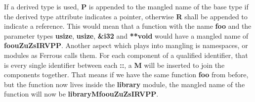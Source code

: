 \noindent
If a derived type is used, \textbf{P} is appended to the mangled name of the base type
if the derived type attribute indicates a pointer, otherwise \textbf{R} shall be appended to
indicate a reference.
\newline\newline
This would mean that a function with the name \textbf{foo}
and the parameter types \textbf{usize}, \textbf{usize}, \textbf{\&i32} and \textbf{**void}
would have a mangled name of \textbf{foouZuZsIRVPP}.
\newline\newline
Another aspect which plays into mangling is namespaces, or modules as Ferrous calls them.
For each component of a qualified identifier, that is every single identifier between each
\textbf{::}, a \textbf{M} will be inserted to join the components together.
\newline\newline
That means if we have the same function \textbf{foo} from before, but the function now lives
inside the \textbf{library} module, the mangled name of the function will now be
\textbf{libraryMfoouZuZsIRVPP}.